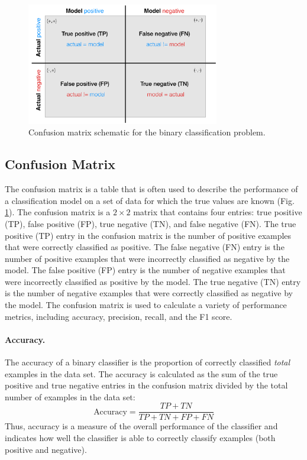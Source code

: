 \documentclass{article}[11pt]
\begin{document}
\begin{figure}
    \centering
	\includegraphics[width=0.75\textwidth]{./figs/Fig-BinaryConfusionMatrix.pdf}
	\caption{Confusion matrix schematic for the binary classification problem.}\label{fig:binaryconfusionmatrx}
\end{figure}

\subsection{Confusion Matrix}
The confusion matrix is a table that is often used to describe the performance of a classification model on a set of data for which the true values are known (Fig. \ref{fig:binaryconfusionmatrx}).
The confusion matrix is a $2\times{2}$ matrix that contains four entries: true positive (TP), false positive (FP), true negative (TN), and false negative (FN).
The true positive (TP) entry in the confusion matrix is the number of positive examples that were correctly classified as positive.
The false negative (FN) entry is the number of positive examples that were incorrectly classified as negative by the model.
The false positive (FP) entry is the number of negative examples that were incorrectly classified as positive by the model.
The true negative (TN) entry is the number of negative examples that were correctly classified as negative by the model.
The confusion matrix is used to calculate a variety of performance metrics, including accuracy, precision, recall, and the F1 score.

\paragraph*{Accuracy.}
The accuracy of a binary classifier is the proportion of correctly classified \textit{total} examples in the data set.
The accuracy is calculated as the sum of the true positive and true negative entries in the confusion matrix divided by the total number of examples in the data set:
\begin{equation*}
    \text{Accuracy} = \frac{TP + TN}{TP + TN + FP + FN}
\end{equation*}
Thus, accuracy is a measure of the overall performance of the classifier and indicates how well the classifier is able to correctly classify examples (both positive and negative).
\end{document}
